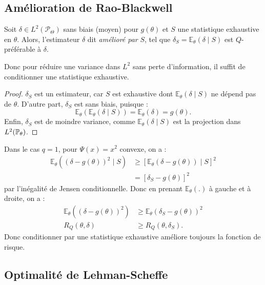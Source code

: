 \subsection{Amélioration de Rao-Blackwell}

\begin{theorem}
    Soit $ \delta \in L^2( \mathcal{P}_\Theta)$ sans biais (moyen) pour $g( \theta)$ et 
    $S$ une statistique exhaustive en $ \theta$. Alors, l'estimateur 
    $ \delta$ dit \emph{amélioré par} $S$, tel que $ \delta_S = \mathbb{E}_\theta( \delta \mid S)$ 
    est $Q$-préférable à $ \delta$. 
\end{theorem}

Donc pour réduire une variance dans $L^2$ sans perte d'information, il suffit de conditionner 
une statistique exhaustive. 

\begin{proof}
    $ \delta_S$ est un estimateur, car $S$ est exhaustive dont $ \mathbb{E}_\theta( \delta \mid S)$ 
    ne dépend pas de $ \theta$. 
    D'autre part, $ \delta_S$ est sans biais, puisque : 
        $$ \mathbb{E}_\theta( \mathbb{E}_\theta( \delta \mid S)) = \mathbb{E}_\theta( \delta) = g( \theta). $$
    Enfin, $ \delta_S$ est de moindre variance, comme $ \mathbb{E}_\theta( \delta \mid S)$ est 
    la projection dans $L^2( \mathbb{P}_\theta)$. 
\end{proof}

\begin{remark}
    Dans le cas $ q = 1$, pour $ \Psi(x) = x^2$ convexe, on a : 
        \begin{align*}
            \mathbb{E}_\theta( ( \delta - g( \theta))^2 \mid S) & \geqslant \left[ \mathbb{E}_\theta( \delta - g( \theta)) \mid S\right]^2 \\ 
            &= [ \delta_S - g( \theta)]^2
        \end{align*}
    par l'inégalité de Jensen conditionnelle. Donc en prenant $ \mathbb{E}_\theta(.)$ à gauche 
    et à droite, on a : 
        \begin{align*}
            \mathbb{E}_\theta( ( \delta - g( \theta))^2) & \geqslant \mathbb{E}_\theta( \delta_S - g( \theta))^2 \\
            R_Q( \theta, \delta) & \geqslant R_Q( \theta, \delta_S).
        \end{align*}
    Donc conditionner par une statistique exhaustive améliore toujours la fonction 
    de risque. 
\end{remark}

\subsection{Optimalité de Lehman-Scheffe}

